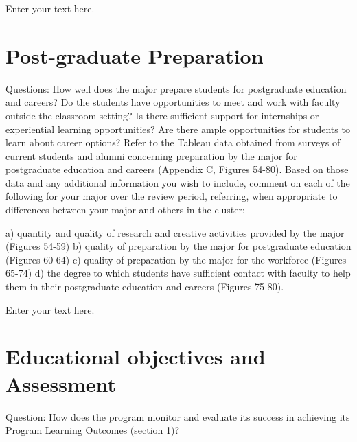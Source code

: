 \documentclass[12pt]{article}
\begin{document}
Enter your text here.

\section{Post-graduate Preparation}
Questions: How well does the major prepare students for postgraduate education and careers? Do the students have opportunities to meet and work with faculty outside the classroom setting? Is there sufficient support for internships or experiential learning opportunities? Are there ample opportunities for students to learn about career options?  
Refer to the Tableau data obtained from surveys of current students and alumni concerning preparation by the major for postgraduate education and careers (Appendix C, Figures 54-80). Based on those data and any additional information you wish to include, comment on each of the following for your major over the review period, referring, when appropriate to differences between your major and others in the cluster:

    a) quantity and quality of research and creative activities provided by the major (Figures 54-59)
    b) quality of preparation by the major for postgraduate education (Figures 60-64)
    c) quality of preparation by the major for the workforce (Figures 65-74)
    d) the degree to which students have sufficient contact with faculty to help them in their postgraduate education and careers (Figures 75-80).

Enter your text here.

\section{Educational objectives and Assessment}

Question: How does the program monitor and evaluate its success in achieving its Program  Learning Outcomes (section 1)?  
\end{document}
